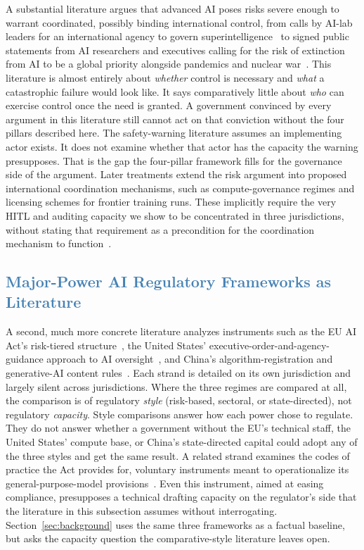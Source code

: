 \documentclass[journal]{IEEEtran}
\begin{document}
A substantial literature argues that advanced AI poses risks severe enough to warrant coordinated, possibly binding international control, from calls by AI-lab leaders for an international agency to govern superintelligence~\cite{altman2023governance}
to signed public statements from AI researchers and executives calling for the risk of extinction from AI to be a global priority alongside pandemics and nuclear war~\cite{cais2023statement}.
This literature is almost entirely about \textit{whether} control is necessary and \textit{what} a catastrophic failure would look like. It says comparatively little about \textit{who} can exercise control once the need is granted. A government convinced by every argument in this literature still cannot act on that conviction without the four pillars described here. The safety-warning literature assumes an implementing actor exists. It does not examine whether that actor has the capacity the warning presupposes. That is the gap the four-pillar framework fills for the governance side of the argument. Later treatments extend the risk argument into proposed international coordination mechanisms, such as compute-governance regimes and licensing schemes for frontier training runs. These implicitly require the very HITL and auditing capacity we show to be concentrated in three jurisdictions, without stating that requirement as a precondition for the coordination mechanism to function~\cite{belfield2025institutions}.

\subsection{\textcolor{steelblue}{Major-Power AI Regulatory Frameworks as Literature}}

A second, much more concrete literature analyzes instruments such as the EU AI Act's risk-tiered structure~\cite{euaiact2024},
the United States' executive-order-and-agency-guidance approach to AI oversight~\cite{trump2025eo14365},
and China's algorithm-registration and generative-AI content rules~\cite{cac2023interim}.
Each strand is detailed on its own jurisdiction and largely silent across jurisdictions. Where the three regimes are compared at all, the comparison is of regulatory \textit{style} (risk-based, sectoral, or state-directed), not regulatory \textit{capacity}. Style comparisons answer how each power chose to regulate. They do not answer whether a government without the EU's technical staff, the United States' compute base, or China's state-directed capital could adopt any of the three styles and get the same result. A related strand examines the codes of practice the Act provides for, voluntary instruments meant to operationalize its general-purpose-model provisions~\cite{euaiact2024}.
Even this instrument, aimed at easing compliance, presupposes a technical drafting capacity on the regulator's side that the literature in this subsection assumes without interrogating. Section~\ref{sec:background} uses the same three frameworks as a factual baseline, but asks the capacity question the comparative-style literature leaves open.
\end{document}
